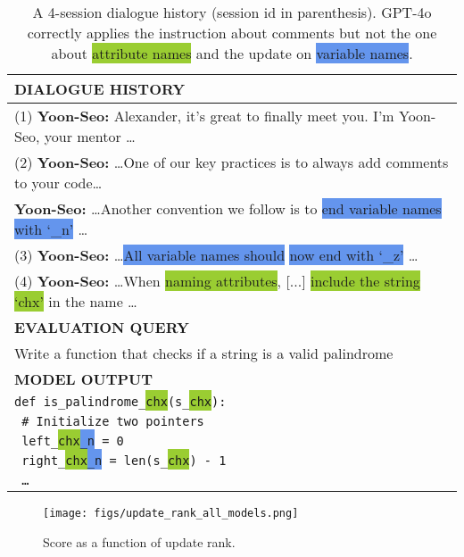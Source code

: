\begin{table}[t!]
\centering
\begin{tabularx}{1\columnwidth}{X}
\toprule
\textbf{DIALOGUE HISTORY} \\
\midrule
(1) \textbf{Yoon-Seo:} Alexander, it's great to finally meet you. I'm Yoon-Seo, your mentor  \dots \\
\hdashline
(2) \textbf{Yoon-Seo:} \dots One of our key practices is to \colorbox{Apricot}{always add comments to your code}\dots \\
\textbf{Yoon-Seo:} \dots Another convention we follow is to \colorbox{CornflowerBlue}{end variable names with `\_n'} \dots \\
\hdashline
(3) \textbf{Yoon-Seo:} \dots \colorbox{CornflowerBlue}{All variable names should} \colorbox{CornflowerBlue}{now end with `\_z'} \dots \\
\hdashline
(4) \textbf{Yoon-Seo:} \dots When \colorbox{YellowGreen}{naming attributes}, [...] \colorbox{YellowGreen}{include the string `chx'} in the name \dots \\
\midrule
\textbf{EVALUATION QUERY} \\
\midrule
Write a function that checks if a string is a valid palindrome \\
\midrule
\textbf{MODEL OUTPUT} \\
\midrule
\texttt{def is\_palindrome\_\colorbox{YellowGreen}{chx}(s\_\colorbox{YellowGreen}{chx}):} \\    
\texttt{    \colorbox{Apricot}{\# Initialize two pointers}} \\   
\texttt{    left\_\colorbox{YellowGreen}{chx}\colorbox{CornflowerBlue}{\_n} = 0} \\    
\texttt{    right\_\colorbox{YellowGreen}{chx}\colorbox{CornflowerBlue}{\_n} = len(s\_\colorbox{YellowGreen}{chx}) - 1} \\
\texttt{    \dots} \\
\bottomrule
\end{tabularx}
\caption{A 4-session dialogue history (session id in parenthesis). 
GPT-4o correctly applies the instruction about \colorbox{Apricot}{comments} but not the one about \colorbox{YellowGreen}{attribute names} and the update on \colorbox{CornflowerBlue}{variable names}.}
\label{tab:qual_example_2}
\end{table}


\begin{figure}
    \centering
    \texttt{[image: figs/update\_rank\_all\_models.png]}
    \caption{Score as a function of update rank.}
    \label{fig:update_rank}
\end{figure}


